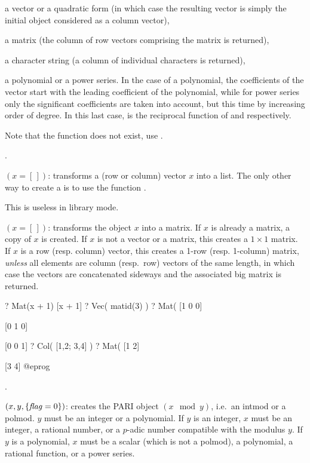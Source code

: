 \item a vector or a quadratic form (in which case the resulting vector is
simply the initial object considered as a column vector),

\item a matrix (the column of row vectors comprising the matrix is
returned),

\item a character string (a column of individual characters is returned),

\item a polynomial or a power series. In the case of a polynomial, the
coefficients of the vector start with the leading coefficient of the
polynomial, while for power series only the significant coefficients are
taken into account, but this time by increasing order of degree. In this last
case,  is the reciprocal function of  and 
respectively.

Note that the function  does not exist, use .

.

$({x=[\,]})$: transforms a (row or column) vector $x$
into a list. The only other way to create a  is to use the
function .

This is useless in library mode.

$({x=[\,]})$: transforms the object $x$ into a matrix.
If $x$ is already a matrix, a copy of $x$ is created.
If $x$ is not a vector or a matrix, this creates a $1\times 1$ matrix.
If $x$ is a row (resp. column) vector, this creates a 1-row (resp.
1-column) matrix, \emph{unless} all elements are column (resp.~row) vectors
of the same length, in which case the vectors are concatenated sideways
and the associated big matrix is returned.

\bprog
  ? Mat(x + 1)
  [x + 1]
  ? Vec( matid(3) )
  ? Mat(%
  [1 0 0]

  [0 1 0]

  [0 0 1]
  ? Col( [1,2; 3,4] )
  ? Mat(%
  [1 2]

  [3 4]
@eprog

.

$(x,y,\{\hbox{\it f\kern0pt lag\/}=0\})$:\label{se:Mod} creates the PARI object
$(x \mod y)$, i.e.~an intmod or a polmod. $y$ must be an integer or a
polynomial. If $y$ is an integer, $x$ must be an integer, a rational
number, or a $p$-adic number compatible with the modulus $y$. If $y$ is a
polynomial, $x$ must be a scalar (which is not a polmod), a polynomial, a
rational function, or a power series.

